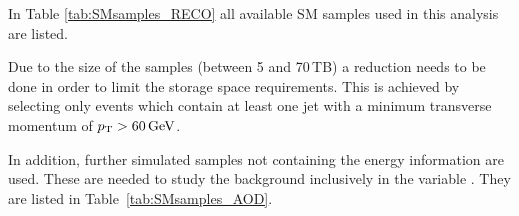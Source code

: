 In Table \ref{tab:SMsamples_RECO} all available SM samples used in this analysis are listed.
\renewcommand{\arraystretch}{1.5}
\begin{table}[!h]
\centering
\caption{Available Standard Model background samples containing $\Delta E/\Delta x$ information that are used for background estimation studies.}
\label{tab:SMsamples_RECO}
\end{table}  
Due to the size of the samples (between 5 and 70\,TB) a reduction needs to be done in order to limit the storage space requirements.
This is achieved by selecting only events which contain at least one jet with a minimum transverse momentum of $p_{\text{T}}>60\,\text{Ge}\kern-0.06667em\text{V}$.

In addition, further simulated samples not containing the energy information are used.
These are needed to study the background inclusively in the variable \dedx.
They are listed in Table~\ref{tab:SMsamples_AOD}.
\renewcommand{\arraystretch}{1.5}
\begin{table}[!h]
\centering
\caption{Standard Model background samples without $\Delta E/\Delta x$ information.}
\label{tab:SMsamples_AOD}
\end{table}  

